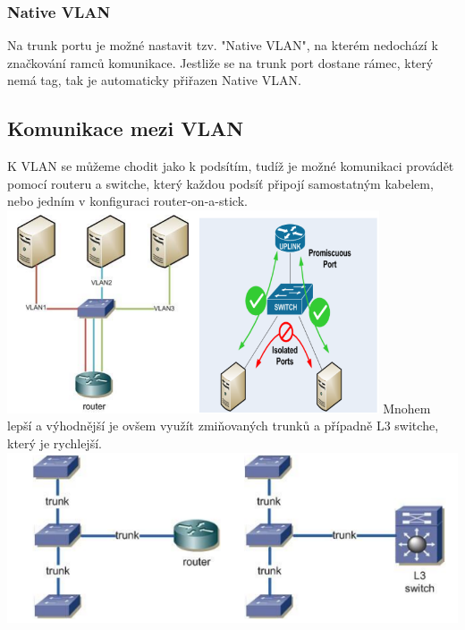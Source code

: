 \subsubsection{Native VLAN}
Na trunk portu je možné nastavit tzv. "Native VLAN", na kterém nedochází k značkování ramců komunikace.
Jestliže se na trunk port dostane rámec, který nemá tag, tak je automaticky přiřazen Native VLAN.
\subsection{Komunikace mezi VLAN}
K VLAN se můžeme chodit jako k podsítím, tudíž je možné komunikaci provádět pomocí routeru a switche, který každou podsíť připojí samostatným kabelem, nebo jedním v konfiguraci router-on-a-stick. \\
\includegraphics[width=\linewidth, height=6cm]{TVY-POS/VLAN/VLAN-router.png}
Mnohem lepší a výhodnější je ovšem využít zmiňovaných trunků a případně L3 switche, který je rychlejší.
\includegraphics[width=\linewidth]{TVY-POS/VLAN/VLAN-trunk.png}
